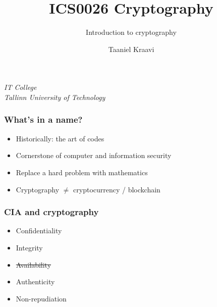 
\usepackage{crysymb}

\usepackage{graphicx}

\usepackage{soul}

\usepackage{csquotes}

\usepackage{fontspec}
\usepackage{unicode-math}
\usepackage{microtype}

\usepackage[en-GB]{datetime2}

\title{ICS0026 Cryptography}
\subtitle{Introduction to cryptography}
\date{}
\author{Taaniel Kraavi}
\institute%
{%
  \textit{IT College}\\
  \textit{Tallinn University of Technology}
}


\begin{frame}[plain]
  \titlepage
\end{frame}

\begin{frame}
  \frametitle{What's in a name?}

  \pause
  \begin{itemize}[<+->]
    \item Historically: the art of codes
    \item Cornerstone of computer and information security
    \item Replace a hard problem with mathematics
    \item Cryptography $\neq$ cryptocurrency / blockchain
  \end{itemize}
\end{frame}

\begin{frame}
  \frametitle{CIA and cryptography}

  \pause
  \begin{itemize}[<+(1)->]
    \item Confidentiality
    \item Integrity
    \item \st{Availability}
    \pause
    \item Authenticity
    \item Non-repudiation
  \end{itemize}
\end{frame}

